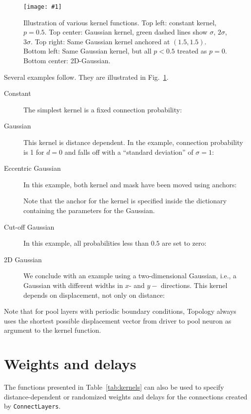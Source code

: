 \documentclass[a4paper,12pt]{report}
\newcommand{\scriptfig}[4]{%
\begin{figure}
\centerline{\texttt{[image: \#1]}}
\caption[#3]{#4}
\label{fig:#1}
\end{figure}%
}
\begin{document}
\scriptfig{conn4}{0.9}{Kernel functions}%
{Illustration of various kernel functions. Top left: constant kernel,
  $p=0.5$. Top center: Gaussian kernel, green dashed lines show
  $\sigma$, $2\sigma$, $3\sigma$. Top right: Same Gaussian kernel
  anchored at $(1.5,1.5)$. Bottom left: Same Gaussian kernel, but all
  $p<0.5$ treated as $p=0$. Bottom center: 2D-Gaussian.}

Several examples follow. They are illustrated in Fig.~\ref{fig:conn4}.
\begin{description}
\item[Constant] The simplest kernel is a fixed connection
  probability:

\item[Gaussian] This kernel is distance dependent. In the example,
  connection probability is 1 for $d=0$ and falls off with a
  ``standard deviation'' of $\sigma=1$:
\newline

\item[Eccentric Gaussian] In this example, both kernel and mask have
  been moved using anchors:

Note that the anchor for the kernel is specified inside the dictionary
containing the parameters for the Gaussian.
\item[Cut-off Gaussian] In this example, all probabilities less than
  $0.5$ are set to zero:

\item[2D Gaussian] We conclude with an
  example using a two-dimensional Gaussian, i.e., a Gaussian with
  different widths in $x$- and $y-$ directions. This kernel depends on
  displacement, not only on distance:

\end{description}
Note that for pool layers with periodic boundary conditions, Topology
always uses the shortest possible displacement vector from driver
to pool neuron as argument to the kernel function.


\section{Weights and delays}\label{sec:conn_wd}

The functions presented in Table~\ref{tab:kernels} can also be used to
specify distance-dependent or randomized weights and delays for the connections
created by \lstinline!ConnectLayers!.
\end{document}
